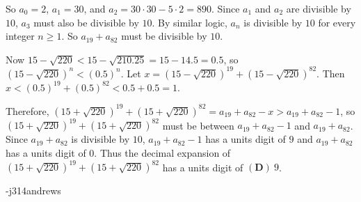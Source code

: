 \begin{enumerate}
 So $a_0 = 2$, $a_1 = 30$, and $a_2 = 30 \cdot 30 - 5 \cdot 2 = 890$.  Since $a_1$ and $a_2$ are divisible by $10$, $a_3$ must also be divisible by $10$.  By similar logic, $a_n$ is divisible by $10$ for every integer $n \geq 1$.  So $a_{19} + a_{82}$ must be divisible by $10$.

 Now $15 - \sqrt{220} < 15 - \sqrt{210.25} = 15 - 14.5 = 0.5$, so $\left(15 - \sqrt{220}\right)^n < (0.5)^n$.  Let $x = \left(15 - \sqrt{220}\right)^{19} + \left(15 - \sqrt{220}\right)^{82}$.  Then $x < (0.5)^{19} + (0.5)^{82} < 0.5 + 0.5 = 1$.

 Therefore, $\left(15 + \sqrt{220}\right)^{19} + \left(15 + \sqrt{220}\right)^{82} = a_{19} + a_{82} - x > a_{19} + a_{82} - 1$, so $\left(15 + \sqrt{220}\right)^{19} + \left(15 + \sqrt{220}\right)^{82}$ must be between $a_{19}+a_{82}-1$ and $a_{19}+a_{82}$.  Since $a_{19} + a_{82}$ is divisible by $10$, $a_{19}+a_{82}-1$ has a units digit of $9$ and $a_{19}+a_{82}$ has a units digit of $0$.  Thus the decimal expansion of $\left(15 + \sqrt{220}\right)^{19} + \left(15 + \sqrt{220}\right)^{82}$ has a units digit of $\boxed{(\mathbf{D})\ 9}$.

 -j314andrews

 


\end{enumerate}